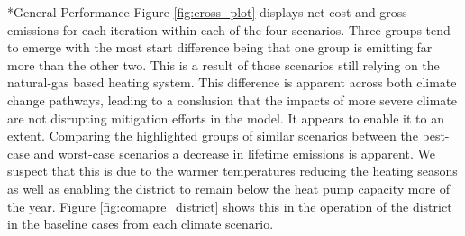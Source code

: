 \documentclass[twocolumn, a4paper,10pt]{article}
\makeatletter
\renewcommand\subsection{\@startsection{subsection}{1}{\z@}{\z@}{\z@}{\normalfont\normalsize\bfseries}}
\renewcommand\subsection{\@startsection{subsection}{1}{\z@}{\z@}{0.1pt}{\normalfont\normalsize\bfseries}}
\makeatother
\begin{document}
\subsection*{General Performance}
Figure \ref{fig:cross_plot} displays net-cost and gross emissions for each iteration within each of the four scenarios. Three groups tend to emerge with the most start difference being that one group is emitting far more than the other two. This is a result of those scenarios still relying on the natural-gas based heating system. This difference is apparent across both climate change pathways, leading to a conslusion that the impacts of more severe climate are not disrupting mitigation efforts in the model. It appears to enable it to an extent. Comparing the highlighted groups of similar scenarios between the best-case and worst-case scenarios a decrease in lifetime emissions is apparent. We suspect that this is due to the warmer temperatures reducing the heating seasons as well as enabling the district to remain below the heat pump capacity more of the year. Figure \ref{fig:comapre_district} shows this in the operation of the district in the baseline cases from each climate scenario.
\end{document}

